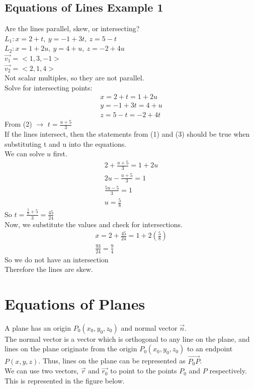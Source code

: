 \documentclass[12pt]{article}
\begin{document}
\subsection{Equations of Lines Example 1}
Are the lines parallel, skew, or intersecting?\\%
$L_1: x = 2 + t,\ y = -1 + 3t,\ z = 5-t$\\%
$L_2: x = 1 + 2u,\ y = 4 + u,\ z = -2 + 4u$\\%
$\vec{v_1}=<1, 3, -1>  $\\%
$\vec{v_2} =<2,1,4> $\\%
Not scalar multiples, so they are not parallel.\\%
Solve for intersecting points:
\begin{align}
	x=2+t=1+2u\\%
	y=-1+3t=4+u\\%
	z=5-t=-2+4t
\end{align}
From (2) $\rightarrow$  \(t=\frac{u+5}{3}\)\\%
If the lines intersect, then the statements from (1) and (3) should be true when substituting t and u into the equations.
\\We can solve \(u\) first.
\begin{align}
	2+\frac{u+5}{3}=1+2u\\%
	2u-\frac{u+5}{3}=1\\%
	\frac{5u-5}{3}=1\\%
	u = \frac{5}{8}
\end{align}
So \(t=\frac{\frac{5}{8}+5}{3}= \frac{45}{24}\)\\%
Now, we substitute the values and check for intersections.
\begin{align}
	x=2+\frac{45}{24}=1+2 (\frac{5}{8})\\%
	\frac{93}{24}=\frac{9}{4}
\end{align}
So we do not have an intersection\\%
Therefore the lines are skew.

\section{Equations of Planes}
A plane has an origin \(P_0(x_0,y_0,z_0)\) and normal vector \(\vec{n} \).\\%
The normal vector is a vector which is orthogonal to any line on the plane, and lines on the plane originate from the origin \(P_0(x_0,y_0,z_0)\) to an endpoint \(P(x,y,z)\). Thus, lines on the plane can be represented as \(\vec{P_0P} \). \\%
We can use two vectors, \(\vec{r}\) and  \( \vec{r_0} \) to point to the points \(P_0\) and \(P\) respectively. This is represented in the figure below.
\end{document}
